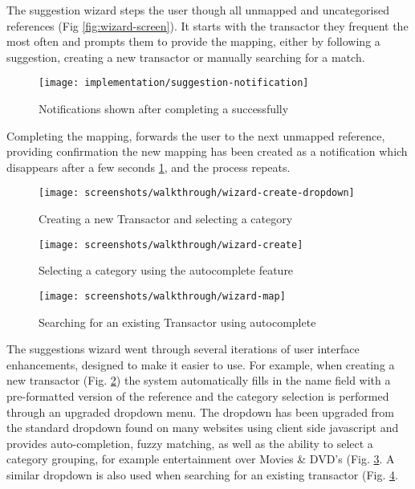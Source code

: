 The suggestion wizard steps the user though all unmapped and uncategorised references (Fig \ref{fig:wizard-screen}). It starts with the transactor they frequent the most often and prompts them to provide the mapping, either by following a suggestion, creating a new transactor or manually searching for a match.

\begin{figure}
\centering
\texttt{[image: implementation/suggestion-notification]}
\caption{Notifications shown after completing a successfully}
\label{fig:suggestion-complete-notification}
\end{figure}

Completing the mapping, forwards the user to the next unmapped reference, providing confirmation the new mapping has been created as a notification which disappears after a few seconds \ref{fig:suggestion-complete-notification}, and the process repeats.

\begin{figure}
\centering
\texttt{[image: screenshots/walkthrough/wizard-create-dropdown]}
\caption{Creating a new Transactor and selecting a category}
\label{fig:create-new-transactor}
\end{figure}

\begin{figure}
\centering
\texttt{[image: screenshots/walkthrough/wizard-create]}
\caption{Selecting a category using the autocomplete feature}
\label{fig:dropdown-autocomplete}
\end{figure}

\begin{figure}
\centering
\texttt{[image: screenshots/walkthrough/wizard-map]}
\caption{Searching for an existing Transactor using autocomplete}
\label{fig:wizard-map-dropdown}
\end{figure}

The suggestions wizard went through several iterations of user interface enhancements, designed to make it easier to use.
%
For example, when creating a new transactor (Fig. \ref{fig:create-new-transactor}) the system automatically fills in the name field with a pre-formatted version of the reference and the category selection is performed through an upgraded dropdown menu. The dropdown has been upgraded from the standard dropdown found on many websites using client side javascript and provides auto-completion, fuzzy matching, as well as the ability to select a category grouping, for example entertainment over Movies \& DVD's (Fig. \ref{fig:dropdown-autocomplete}. A similar dropdown is also used when searching for an existing transactor (Fig. \ref{fig:wizard-map-dropdown}.

